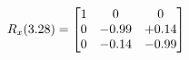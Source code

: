 \documentclass[preview]{standalone}
\begin{document}
\begin{align*}
\special{dvisvgm:raw <g id='unique000'>}R_{x}(3.28) = \begin{bmatrix}1 & 0 & 0 \\0 & -0.99 & +0.14 \\0 & -0.14 & -0.99\end{bmatrix}\special{dvisvgm:raw </g>}
\end{align*}
\end{document}
